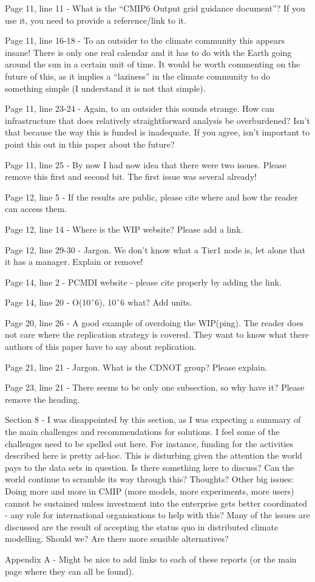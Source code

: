 \documentclass[gmd,manuscript]{copernicus}
\begin{document}
Page 11, line 11 - What is the “CMIP6 Output grid guidance document”?
If you use it, you need to provide a reference/link to it.

Page 11, line 16-18 - To an outsider to the climate community this
appears insane! There is only one real calendar and it has to do with
the Earth going around the sun in a certain unit of time. It would be
worth commenting on the future of this, as it implies a “laziness” in
the climate community to do something simple (I understand it is not
that simple).

Page 11, line 23-24 - Again, to an outsider this sounds strange. How
can infrastructure that does relatively straightforward analysis be
overburdened? Isn’t that because the way this is funded is inadequate.
If you agree, isn’t important to point this out in this paper about
the future?

Page 11, line 25 - By now I had now idea that there were two issues.
Please remove this first and second bit. The first issue was several
already!

Page 12, line 5 - If the results are public, please cite where and how
the reader can access them.

Page 12, line 14 - Where is the WIP website? Please add a link.

Page 12, line 29-30 - Jargon. We don’t know what a Tier1 node is, let
alone that it has a manager. Explain or remove!

Page 14, line 2 - PCMDI website - please cite properly by adding the
link.

Page 14, line 20 - O(10ˆ6), 10ˆ6 what? Add units.

Page 20, line 26 - A good example of overdoing the WIP(ping). The
reader does not care where the replication strategy is covered. They
want to know what there authors of this paper have to say about
replication.

Page 21, line 21 - Jargon. What is the CDNOT group? Please explain.

Page 23, line 21 - There seems to be only one subsection, so why have it? Please
remove the heading.

Section 8 - I was disappointed by this section, as I was expecting a summary of the
main challenges and recommendations for solutions. I feel some of the challenges
need to be spelled out here. For instance, funding for the activities described here is
pretty ad-hoc. This is disturbing given the attention the world pays to the data sets in
question. Is there something here to discuss? Can the world continue to scramble its
way through this? Thoughts? Other big issues: Doing more and more in CMIP (more
models, more experiments, more users) cannot be sustained unless investment into
the enterprise gets better coordinated - any role for international organisations to help
with this? Many of the issues are discussed are the result of accepting the status quo
in distributed climate modelling. Should we? Are there more sensible alternatives?


Appendix A - Might be nice to add links to each of these reports (or
the main page where they can all be found).
\end{document}
